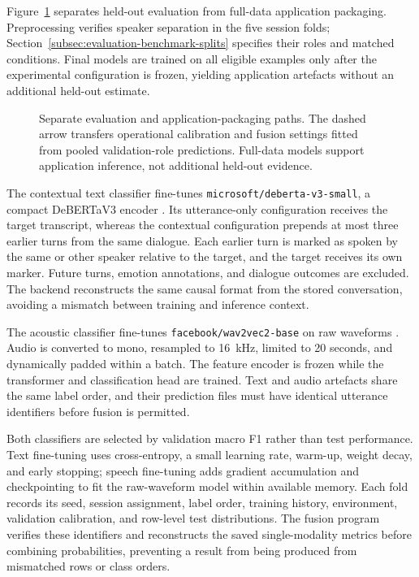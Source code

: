 Figure~\ref{fig:emotion-pipeline} separates held-out evaluation from full-data application packaging. Preprocessing verifies speaker separation in the five session folds; Section~\ref{subsec:evaluation-benchmark-splits} specifies their roles and matched conditions. Final models are trained on all eligible examples only after the experimental configuration is frozen, yielding application artefacts without an additional held-out estimate.

\begin{figure}[htbp]
\centering

\caption[Separate evaluation and application-packaging paths.]{Separate evaluation and application-packaging paths. The dashed arrow transfers operational calibration and fusion settings fitted from pooled validation-role predictions. Full-data models support application inference, not additional held-out evidence.}
\label{fig:emotion-pipeline}
\end{figure}

The contextual text classifier fine-tunes \texttt{microsoft/deberta-v3-small}, a compact DeBERTaV3 encoder \cite{he2021debertav3}. Its utterance-only configuration receives the target transcript, whereas the contextual configuration prepends at most three earlier turns from the same dialogue. Each earlier turn is marked as spoken by the same or other speaker relative to the target, and the target receives its own marker. Future turns, emotion annotations, and dialogue outcomes are excluded. The backend reconstructs the same causal format from the stored conversation, avoiding a mismatch between training and inference context.
\label{subsec:contextual-text-emotion-model}

The acoustic classifier fine-tunes \texttt{facebook/wav2vec2-base} on raw waveforms \cite{baevski2020wav2vec}. Audio is converted to mono, resampled to 16~kHz, limited to 20 seconds, and dynamically padded within a batch. The feature encoder is frozen while the transformer and classification head are trained. Text and audio artefacts share the same label order, and their prediction files must have identical utterance identifiers before fusion is permitted.
\label{subsec:speech-emotion-model}

Both classifiers are selected by validation macro F1 rather than test performance. Text fine-tuning uses cross-entropy, a small learning rate, warm-up, weight decay, and early stopping; speech fine-tuning adds gradient accumulation and checkpointing to fit the raw-waveform model within available memory. Each fold records its seed, session assignment, label order, training history, environment, validation calibration, and row-level test distributions. The fusion program verifies these identifiers and reconstructs the saved single-modality metrics before combining probabilities, preventing a result from being produced from mismatched rows or class orders.

